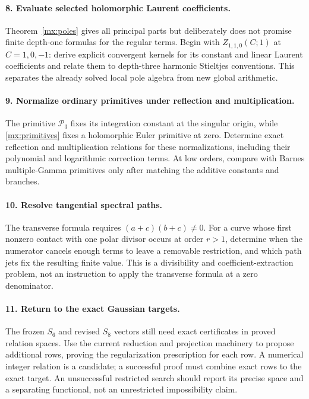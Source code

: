 \paragraph{8. Evaluate selected holomorphic Laurent coefficients.}
Theorem~\ref{mx:poles} gives all principal parts but deliberately
does not promise finite depth-one formulas for the regular terms.
Begin with $Z_{1,1,0}(C;1)$ at $C=1,0,-1$: derive explicit
convergent kernels for its constant and linear Laurent coefficients
and relate them to depth-three harmonic Stieltjes conventions.
This separates the already solved local pole algebra from new
global arithmetic.

\paragraph{9. Normalize ordinary primitives under reflection and multiplication.}
The primitive $\mathcal P_3$ fixes its integration constant at the
singular origin, while \eqref{mx:primitives} fixes a holomorphic
Euler primitive at zero. Determine exact reflection and multiplication
relations for these normalizations, including their polynomial and
logarithmic correction terms. At low orders, compare with Barnes
multiple-Gamma primitives only after matching the additive constants
and branches.

\paragraph{10. Resolve tangential spectral paths.}
The transverse formula requires $(a+c)(b+c)\ne0$. For a curve
whose first nonzero contact with one polar divisor occurs at order
$r>1$, determine when the numerator cancels enough terms to leave
a removable restriction, and which path jets fix the resulting
finite value. This is a divisibility and coefficient-extraction
problem, not an instruction to apply the transverse formula at a
zero denominator.

\paragraph{11. Return to the exact Gaussian targets.}
The frozen $S_6$ and revised $S_8$ vectors still need exact
certificates in proved relation spaces. Use the current reduction
and projection machinery to propose additional rows, proving the
regularization prescription for each row. A numerical integer
relation is a candidate; a successful proof must combine exact
rows to the exact target. An unsuccessful restricted search should
report its precise space and a separating functional, not an
unrestricted impossibility claim.


